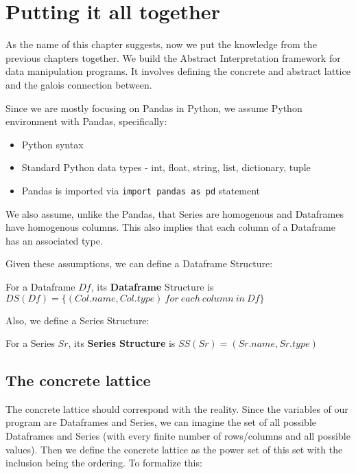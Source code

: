 \chapter{Putting it all together} %

As the name of this chapter suggests, now we put the knowledge from the previous chapters together.
We build the Abstract Interpretation framework for data manipulation programs.
It involves defining the concrete and abstract lattice and the galois connection between.

Since we are mostly focusing on Pandas in Python, we assume Python environment with Pandas, specifically:

\begin{itemize}
    \item Python syntax
    \item Standard Python data types - int, float, string, list, dictionary, tuple
    \item Pandas is imported via \verb|import pandas as pd| statement
\end{itemize}

We also assume, unlike the Pandas, that Series are homogenous and Dataframes have homogenous columns.
This also implies that each column of a Dataframe has an associated type.

Given these assumptions, we can define a Dataframe Structure:

\begin{defn}
    For a Dataframe $Df$, its \textbf{Dataframe} Structure is $DS(Df) = \{(Col.name, Col.type) \: for \: each \: column \: in \: Df\}$
\end{defn}

Also, we define a Series Structure:

\begin{defn}
    For a Series $Sr$, its \textbf{Series Structure} is $SS(Sr) = (Sr.name, Sr.type)$
\end{defn}


\section{The concrete lattice}

The concrete lattice should correspond with the reality.
Since the variables of our program are Dataframes and Series, we can imagine the set of all possible Dataframes and
Series (with every finite number of rows/columns and all possible values).
Then we define the concrete lattice as the power set of this set with the inclusion being the ordering. %
To formalize this:

